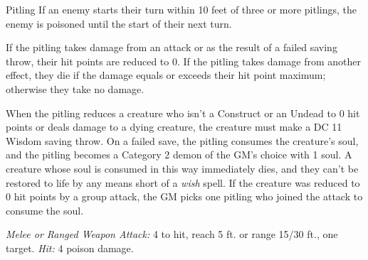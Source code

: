 \documentclass[10pt,a4paper,twoside,bg=print,twocolumn,openany,nodeprecatedcode]{dndbook}
\begin{document}
\begin{DndMonster}[float=t]{Pitling}
\DndMonsterBasics[
armor-class = {14 (natural armor)},
hit-points = {\DndDice{11}},
speed = {30 ft., fly 30 ft.}
]
\DndMonsterAbilityScores[
 str = 11,
 dex = 14,
 con = 12,
 int = 3,
 wis = 6,
 cha = 6
]
\DndMonsterDetails[
damage-immunities = {poison},
condition-immunities = {poisoned},
senses = {darkvision 60 ft., soulsight 10 ft., passive perception 8},
languages = {Abyssal},
challenge = 4,
]
If an enemy starts their turn within 10 feet of three or more pitlings, the enemy is poisoned until the start of their next turn.

If the pitling takes damage from an attack or as the result of a failed saving throw, their hit points are reduced to 0. If the pitling takes damage from another effect, they die if the damage equals or exceeds their hit point maximum; otherwise they take no damage.

When the pitling reduces a creature who isn't a Construct or an Undead to 0 hit points or deals damage to a dying creature, the creature must make a DC 11 Wisdom saving throw. On a failed save, the pitling consumes the creature's soul, and the pitling becomes a Category 2 demon of the GM's choice with 1 soul. A creature whose soul is consumed in this way immediately dies, and they can't be restored to life by any means short of a \textit{wish} spell. If the creature was reduced to 0 hit points by a group attack, the GM picks one pitling who joined the attack to consume the soul.

\textsl{Melee or Ranged Weapon Attack:} 4 to hit, reach 5 ft. or range 15/30 ft., one target. \textsl{Hit:} 4 poison damage.

\end{DndMonster}
\end{document}
